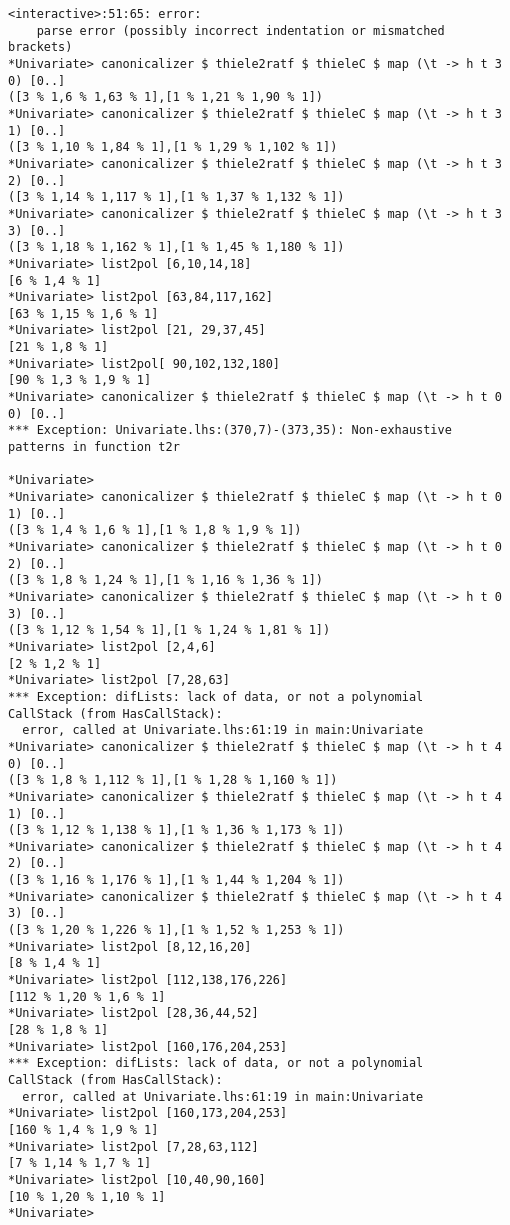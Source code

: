 \documentclass[11pt]{book}
\begin{document}
\begin{verbatim}
<interactive>:51:65: error:
    parse error (possibly incorrect indentation or mismatched brackets)
*Univariate> canonicalizer $ thiele2ratf $ thieleC $ map (\t -> h t 3 0) [0..]
([3 % 1,6 % 1,63 % 1],[1 % 1,21 % 1,90 % 1])
*Univariate> canonicalizer $ thiele2ratf $ thieleC $ map (\t -> h t 3 1) [0..]
([3 % 1,10 % 1,84 % 1],[1 % 1,29 % 1,102 % 1])
*Univariate> canonicalizer $ thiele2ratf $ thieleC $ map (\t -> h t 3 2) [0..]
([3 % 1,14 % 1,117 % 1],[1 % 1,37 % 1,132 % 1])
*Univariate> canonicalizer $ thiele2ratf $ thieleC $ map (\t -> h t 3 3) [0..]
([3 % 1,18 % 1,162 % 1],[1 % 1,45 % 1,180 % 1])
*Univariate> list2pol [6,10,14,18]
[6 % 1,4 % 1]
*Univariate> list2pol [63,84,117,162]
[63 % 1,15 % 1,6 % 1]
*Univariate> list2pol [21, 29,37,45]
[21 % 1,8 % 1]
*Univariate> list2pol[ 90,102,132,180]
[90 % 1,3 % 1,9 % 1]
*Univariate> canonicalizer $ thiele2ratf $ thieleC $ map (\t -> h t 0 0) [0..]
*** Exception: Univariate.lhs:(370,7)-(373,35): Non-exhaustive patterns in function t2r

*Univariate> 
*Univariate> canonicalizer $ thiele2ratf $ thieleC $ map (\t -> h t 0 1) [0..]
([3 % 1,4 % 1,6 % 1],[1 % 1,8 % 1,9 % 1])
*Univariate> canonicalizer $ thiele2ratf $ thieleC $ map (\t -> h t 0 2) [0..]
([3 % 1,8 % 1,24 % 1],[1 % 1,16 % 1,36 % 1])
*Univariate> canonicalizer $ thiele2ratf $ thieleC $ map (\t -> h t 0 3) [0..]
([3 % 1,12 % 1,54 % 1],[1 % 1,24 % 1,81 % 1])
*Univariate> list2pol [2,4,6]
[2 % 1,2 % 1]
*Univariate> list2pol [7,28,63]
*** Exception: difLists: lack of data, or not a polynomial
CallStack (from HasCallStack):
  error, called at Univariate.lhs:61:19 in main:Univariate
*Univariate> canonicalizer $ thiele2ratf $ thieleC $ map (\t -> h t 4 0) [0..]
([3 % 1,8 % 1,112 % 1],[1 % 1,28 % 1,160 % 1])
*Univariate> canonicalizer $ thiele2ratf $ thieleC $ map (\t -> h t 4 1) [0..]
([3 % 1,12 % 1,138 % 1],[1 % 1,36 % 1,173 % 1])
*Univariate> canonicalizer $ thiele2ratf $ thieleC $ map (\t -> h t 4 2) [0..]
([3 % 1,16 % 1,176 % 1],[1 % 1,44 % 1,204 % 1])
*Univariate> canonicalizer $ thiele2ratf $ thieleC $ map (\t -> h t 4 3) [0..]
([3 % 1,20 % 1,226 % 1],[1 % 1,52 % 1,253 % 1])
*Univariate> list2pol [8,12,16,20]
[8 % 1,4 % 1]
*Univariate> list2pol [112,138,176,226]
[112 % 1,20 % 1,6 % 1]
*Univariate> list2pol [28,36,44,52]
[28 % 1,8 % 1]
*Univariate> list2pol [160,176,204,253]
*** Exception: difLists: lack of data, or not a polynomial
CallStack (from HasCallStack):
  error, called at Univariate.lhs:61:19 in main:Univariate
*Univariate> list2pol [160,173,204,253]
[160 % 1,4 % 1,9 % 1]
*Univariate> list2pol [7,28,63,112]
[7 % 1,14 % 1,7 % 1]
*Univariate> list2pol [10,40,90,160]
[10 % 1,20 % 1,10 % 1]
*Univariate> 

\end{verbatim}
\end{document}
